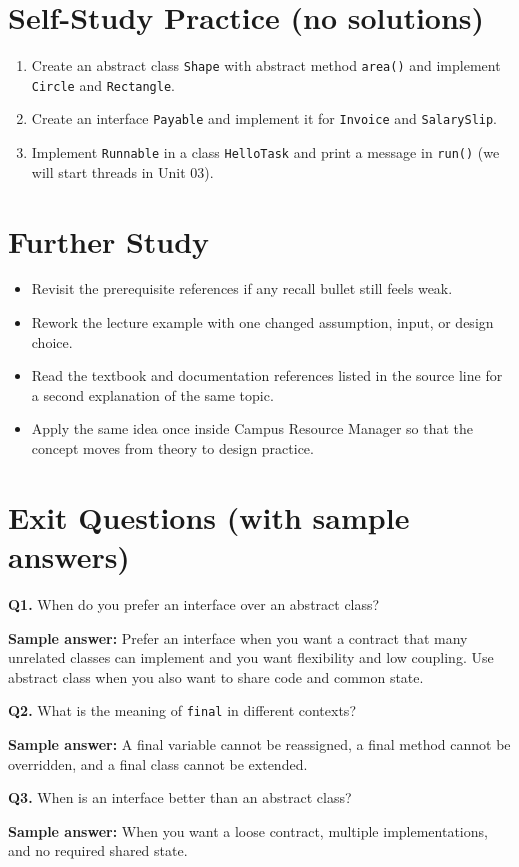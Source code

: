 \documentclass[11pt]{article}
\begin{document}
\section{Self-Study Practice (no solutions)}
\begin{enumerate}
  \item Create an abstract class \texttt{Shape} with abstract method \texttt{area()} and implement \texttt{Circle} and \texttt{Rectangle}.
  \item Create an interface \texttt{Payable} and implement it for \texttt{Invoice} and \texttt{SalarySlip}.
  \item Implement \texttt{Runnable} in a class \texttt{HelloTask} and print a message in \texttt{run()} (we will start threads in Unit 03).
\end{enumerate}

\section{Further Study}
\begin{itemize}
  \item Revisit the prerequisite references if any recall bullet still feels weak.
  \item Rework the lecture example with one changed assumption, input, or design choice.
  \item Read the textbook and documentation references listed in the source line for a second explanation of the same topic.
  \item Apply the same idea once inside Campus Resource Manager so that the concept moves from theory to design practice.
\end{itemize}
\notesources{\OOPSUnitIISources}

\section{Exit Questions (with sample answers)}
\textbf{Q1.} When do you prefer an interface over an abstract class?\par
\textbf{Sample answer:} Prefer an interface when you want a contract that many unrelated classes can implement and you want flexibility and low coupling. Use abstract class when you also want to share code and common state.

\vspace{0.6em}
\textbf{Q2.} What is the meaning of \texttt{final} in different contexts?\par
\textbf{Sample answer:} A final variable cannot be reassigned, a final method cannot be overridden, and a final class cannot be extended.

\vspace{0.6em}
\textbf{Q3.} When is an interface better than an abstract class?\par
\textbf{Sample answer:} When you want a loose contract, multiple implementations, and no required shared state.
\end{document}
